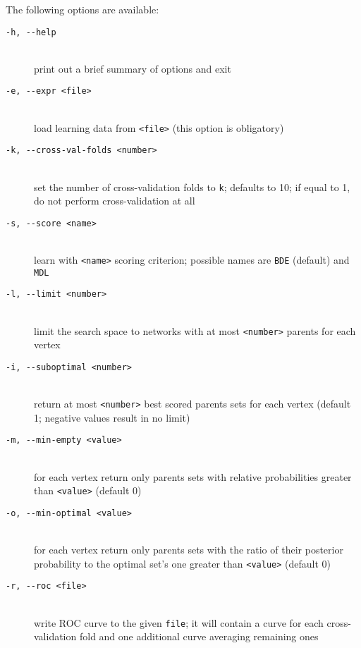 The following options are available:
\begin{description}
\item[\texttt{-h, -\hspace{0pt}-help}]~\\
 print out a brief summary of options and exit
\item[\texttt{-e, -\hspace{0pt}-expr <file>}]~\\
 load learning data from \texttt{<file>} (this option is obligatory)
\item[\texttt{-k, -\hspace{0pt}-cross-val-folds <number>}]~\\
 set the number of cross-validation folds to \texttt{k}; defaults to 10;
 if equal to 1, do not perform cross-validation at all
\item[\texttt{-s, -\hspace{0pt}-score <name>}]~\\
 learn with \texttt{<name>} scoring criterion;
 possible names are \texttt{BDE} (default) and \texttt{MDL}
\item[\texttt{-l, -\hspace{0pt}-limit <number>}]~\\
 limit the search space to networks with at most 
 \texttt{<number>} parents for each vertex
\item[\texttt{-i, -\hspace{0pt}-suboptimal <number>}]~\\
 return at most \texttt{<number>} best scored parents sets for each vertex 
 (default 1; negative values result in no limit)
\item[\texttt{-m, -\hspace{0pt}-min-empty <value>}]~\\
 for each vertex return only parents sets with relative probabilities 
 greater than \texttt{<value>} (default 0)
\item[\texttt{-o, -\hspace{0pt}-min-optimal <value>}]~\\
 for each vertex return only parents sets with the ratio of their
 posterior probability to the optimal set's one
 greater than \texttt{<value>} (default 0)
\item[\texttt{-r, -\hspace{0pt}-roc <file>}]~\\
 write ROC curve to the given \texttt{file}; it will contain a curve for each
 cross-validation fold and one additional curve averaging remaining ones

\end{description}
